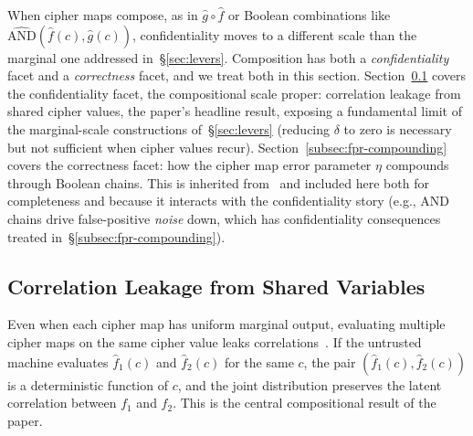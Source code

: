 \documentclass[11pt]{article}
\theoremstyle{definition}
\theoremstyle{plain}
\theoremstyle{remark}
\newcommand{\fhat}{\hat{f}}
\newcommand{\ghat}{\hat{g}}
\begin{document}
When cipher maps compose, as in $\ghat \circ \fhat$ or Boolean
combinations like $\widehat{\mathrm{AND}}(\fhat(c), \ghat(c))$,
confidentiality moves to a different scale than the marginal one
addressed in~\S\ref{sec:levers}.  Composition has both a
\emph{confidentiality} facet and a \emph{correctness} facet, and we
treat both in this section.  Section~\ref{subsec:correlation-leakage}
covers the confidentiality facet, the compositional scale proper:
correlation leakage from shared cipher values, the paper's headline
result, exposing a fundamental limit of the marginal-scale
constructions of~\S\ref{sec:levers} (reducing $\delta$ to zero is
necessary but not sufficient when cipher values recur).
Section~\ref{subsec:fpr-compounding} covers the correctness facet:
how the cipher map error parameter $\eta$ compounds through Boolean
chains.  This is inherited from~\cite[Sec.~7.4]{towell2026cipher} and
included here both for completeness and because it interacts with the
confidentiality story (e.g., AND chains drive false-positive
\emph{noise} down, which has confidentiality consequences treated
in~\S\ref{subsec:fpr-compounding}).

\subsection{Correlation Leakage from Shared Variables}
\label{subsec:correlation-leakage}

Even when each cipher map has uniform marginal output, evaluating multiple
cipher maps on the same cipher value leaks
correlations~\cite[Sec.~8.2]{towell2026cipher}.  If the untrusted machine
evaluates $\fhat_1(c)$ and $\fhat_2(c)$ for the same $c$, the pair
$(\fhat_1(c), \fhat_2(c))$ is a deterministic function of $c$, and the
joint distribution preserves the latent correlation between $f_1$ and
$f_2$.  This is the central compositional result of the paper.
\end{document}
